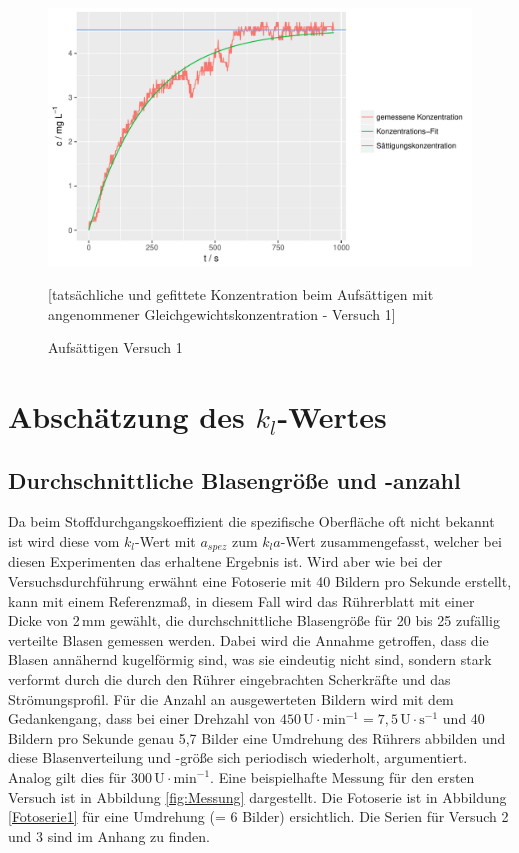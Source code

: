 \documentclass[12pt,liststotoc]{report}
\begin{document}
\begin{figure}[H]
\centering
\includegraphics[width=1\textwidth]{Graphics/aufsaettigen_versuch-1.pdf} 
\caption{Aufsättigen Versuch 1}[tatsächliche und gefittete Konzentration beim Aufsättigen mit angenommener Gleichgewichtskonzentration - Versuch 1]
\label{fig:c_auf_versuch1_saett}
\end{figure}
\noindent



\section{Abschätzung des $k_l$-Wertes}

\subsection{Durchschnittliche Blasengröße und -anzahl}

Da beim Stoffdurchgangskoeffizient die spezifische Oberfläche oft nicht 
bekannt ist wird diese vom $k_l$-Wert mit $a_{spez}$ zum $k_la$-Wert 
zusammengefasst, welcher bei diesen Experimenten das erhaltene Ergebnis 
ist. Wird aber wie bei der Versuchsdurchführung erwähnt eine Fotoserie 
mit 40 Bildern pro Sekunde erstellt, kann mit einem Referenzmaß, in 
diesem Fall wird das Rührerblatt mit einer Dicke von 2\,mm gewählt, die 
durchschnittliche Blasengröße für 20 bis 25 zufällig verteilte Blasen 
gemessen werden. Dabei wird die Annahme getroffen, dass die Blasen 
annähernd kugelförmig sind, was sie eindeutig nicht sind, sondern stark 
verformt durch die durch den Rührer eingebrachten Scherkräfte und das 
Strömungsprofil. Für die Anzahl an ausgewerteten Bildern wird mit dem 
Gedankengang, dass bei einer Drehzahl von $450\,\text{U}\cdot\text{min}^{-1} =
7,5\,\text{U}\cdot\text{s}^{-1}$ und 40 Bildern pro Sekunde genau 5,7 Bilder eine Umdrehung des Rührers abbilden und diese Blasenverteilung und -größe sich
periodisch wiederholt, argumentiert. Analog gilt dies für 
$300\,\text{U}\cdot\text{min}^{-1}$. Eine beispielhafte Messung für den ersten Versuch ist in Abbildung \ref{fig:Messung} dargestellt. Die Fotoserie ist in 
Abbildung \ref{Fotoserie1} für eine Umdrehung (= 6 Bilder) ersichtlich. 
Die Serien für Versuch 2 und 3 sind im Anhang zu finden.
\end{document}
